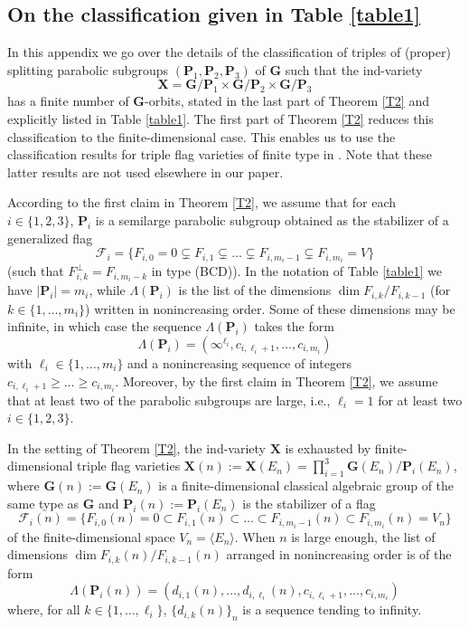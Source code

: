 \documentclass[12pt]{amsart}
\newcommand{\G}{\mathbf{G}}
\renewcommand{\P}{\mathbf{P}}
\newcommand{\X}{\mathbf{X}}
\newcommand{\Ff}{\mathcal{F}}
\renewcommand{\span}[1]{\langle #1\rangle}
\newcommand{\length}[1]{|#1|}
\numberwithin{equation}{section}
\theoremstyle{definition}
\begin{document}
\begin{appendix}

\section{On the classification given in Table \ref{table1}}
\label{appendix}

In this appendix we go over the details of the classification of triples of (proper) splitting parabolic subgroups $(\P_1,\P_2,\P_3)$ of $\G$ such that the ind-variety
\[\X=\G/\P_1\times\G/\P_2\times\G/\P_3\]
has a finite number of $\G$-orbits,
stated in the last part of Theorem \ref{T2} and explicitly listed in Table \ref{table1}. 
The first part of Theorem \ref{T2} reduces this classification to the finite-dimensional case.
This enables us to use the classification results for triple flag varieties of finite type in \cite{MWZ1,MWZ2,Matsuki1,Matsuki2}.
Note that these latter results are not used elsewhere in our paper.

According to the first claim in Theorem \ref{T2}, we assume that for each $i\in\{1,2,3\}$, $\P_i$ is a semilarge parabolic subgroup obtained as the stabilizer of a generalized flag
\[\Ff_i=\{F_{i,0}=0\subsetneq F_{i,1}\subsetneq\ldots\subsetneq F_{i,m_i-1}\subsetneq F_{i,m_i}=V\}\]
(such that $F_{i,k}^\perp=F_{i,m_i-k}$ in type (BCD)).
In the notation of Table \ref{table1} we have
$\length{\P_i}=m_i$, while $\Lambda(\P_i)$ is the list of the dimensions $\dim F_{i,k}/F_{i,k-1}$ (for $k\in\{1,\ldots,m_i\}$) written in nonincreasing order. Some of these dimensions may be infinite, in which case the sequence $\Lambda(\P_i)$ takes the form
\[
\Lambda(\P_i)=(\infty^{\ell_i},c_{i,\ell_i+1},\ldots,c_{i,m_i})
\]
with $\ell_i\in\{1,\ldots,m_i\}$ and a nonincreasing sequence of integers $c_{i,\ell_i+1}\geq\ldots\geq c_{i,m_i}$. Moreover, by the first claim in Theorem \ref{T2}, we assume that at least two of the parabolic subgroups are large, i.e., $\ell_i=1$
for at least two $i\in\{1,2,3\}$.

In the setting of Theorem \ref{T2}, the ind-variety $\X$ is exhausted by finite-dimensional triple flag varieties $\X(n):=\X(E_n)=\prod_{i=1}^3\G(E_n)/\P_i(E_n)$,
where $\G(n):=\G(E_n)$ is a finite-dimensional classical algebraic group of the same type as $\G$ and $\P_i(n):=\P_i(E_n)$ is the stabilizer of a flag
\[\Ff_i(n)=\{F_{i,0}(n)=0\subset F_{i,1}(n)\subset\ldots\subset F_{i,m_i-1}(n)\subset F_{i,m_i}(n)=V_n\}\]
of the finite-dimensional space $V_n=\span{E_n}$.
When $n$ is large enough, 
the list of dimensions $\dim F_{i,k}(n)/F_{i,k-1}(n)$ arranged in nonincreasing order is of the form
\[
\Lambda(\P_i(n))=(d_{i,1}(n),\ldots,d_{i,\ell_i}(n),c_{i,\ell_i+1},\ldots,c_{i,m_i})
\]
where, for all $k\in\{1,\ldots,\ell_i\}$, $\{d_{i,k}(n)\}_n$ is a sequence tending to infinity.


\end{appendix}
\end{document}
